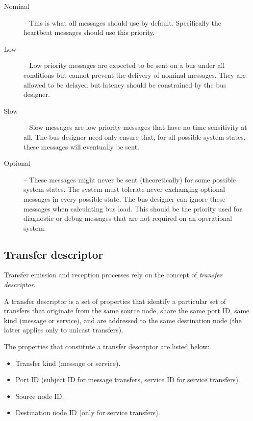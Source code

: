 \begin{description}
    \item[Nominal] -- This is what all messages should use by default.
    Specifically the heartbeat messages should use this priority.

    \item[Low] -- Low priority messages are expected to be sent on a bus under all conditions but cannot
    prevent the delivery of nominal messages.
    They are allowed to be delayed but latency should be constrained by the bus designer.

    \item[Slow] -- Slow messages are low priority messages that have no time sensitivity at all.
    The bus designer need only ensure that, for all possible system states,
    these messages will eventually be sent.

    \item[Optional] -- These messages might never be sent (theoretically) for some possible system states.
    The system must tolerate never exchanging optional messages in every possible state.
    The bus designer can ignore these messages when calculating bus load.
    This should be the priority used for diagnostic or debug messages that are not required on an operational system.
\end{description}

\subsection{Transfer descriptor}\label{sec:transfer_descriptor}

Transfer emission and reception processes rely on the concept of \emph{transfer descriptor}.

A transfer descriptor is a set of properties that identify a particular set of transfers that originate
from the same source node, share the same port ID, same kind (message or service), and are addressed to the same
destination node (the latter applies only to unicast transfers).

The properties that constitute a transfer descriptor are listed below:

\begin{itemize}
    \item Transfer kind (message or service).
    \item Port ID (subject ID for message transfers, service ID for service transfers).
    \item Source node ID.
    \item Destination node ID (only for service transfers).
\end{itemize}

